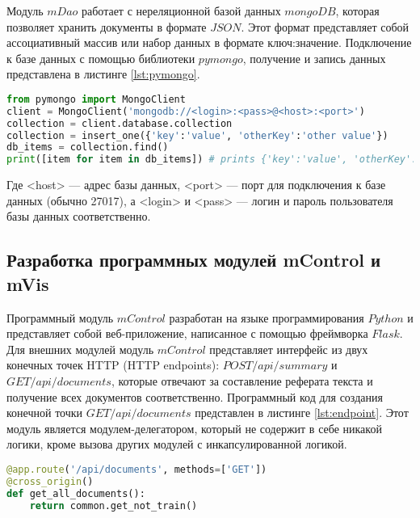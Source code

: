 Модуль $mDao$ работает с нереляционной базой данных $mongoDB$, которая позволяет хранить документы в формате $JSON$. Этот формат представляет собой ассоциативный массив или набор данных в формате ключ:значение. Подключение к базе данных с помощью библиотеки $pymongo$, получение и запись данных представлена в листинге \hyperref[lst:pymongo]{\ref{lst:pymongo}}.

\begin{lstlisting}[language=Python, caption=Работа с базой данных mongoDB с помощью библиотеки pymongo, label=lst:pymongo]
from pymongo import MongoClient
client = MongoClient('mongodb://<login>:<pass>@<host>:<port>')
collection = client.database.collection
collection = insert_one({'key':'value', 'otherKey':'other value'})
db_items = collection.find()
print([item for item in db_items]) # prints {'key':'value', 'otherKey':'other value'}
\end{lstlisting}

Где <host> --- адрес базы данных, <port> --- порт для подключения к базе данных (обычно 27017), а <login> и <pass> --- логин и пароль пользователя базы данных соответственно.

\subsection{Разработка программных модулей mControl и mVis}

Программный модуль $mControl$ разработан на языке программирования $Python$ и представляет собой веб-приложение, написанное с помощью фреймворка $Flask$. Для внешних модулей модуль $mControl$ представляет интерфейс из двух конечных точек HTTP (HTTP endpoints): $POST /api/summary$ и $GET /api/documents$, которые отвечают за составление реферата текста и получение всех документов соответственно. Программный код для создания конечной точки $GET /api/documents$ представлен в листинге \hyperref[lst:endpoint]{\ref{lst:endpoint}}.  Этот модуль является модулем-делегатором, который не содержит в себе никакой логики, кроме вызова других модулей с инкапсулированной логикой.

\begin{lstlisting}[language=Python, caption=Создание конечной точки HTTP, label=lst:endpoint]
@app.route('/api/documents', methods=['GET'])
@cross_origin()
def get_all_documents():
    return common.get_not_train()
\end{lstlisting}

